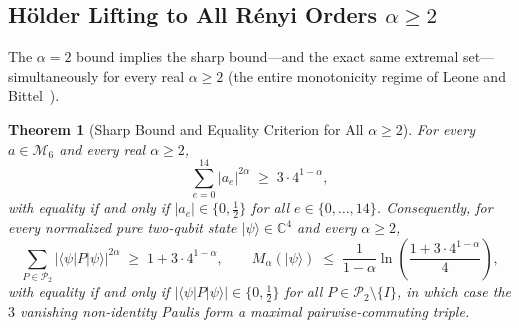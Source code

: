 \documentclass[11pt,a4paper]{article}
\theoremstyle{plain}
\newtheorem{theorem}{Theorem}[section]
\theoremstyle{definition}
\theoremstyle{remark}
\newcommand{\C}{\mathbb{C}}
\newcommand{\ket}[1]{\lvert #1 \rangle}
\newcommand{\expval}[2]{\langle #1 \vert #2 \vert #1 \rangle}
\newcommand{\Pauli}{\mathcal{P}}
\newcommand{\Mman}{\mathcal{M}_6}
\begin{document}
\subsection{H\"older Lifting to All R\'enyi Orders \texorpdfstring{$\alpha \ge 2$}{alpha >= 2}}

The $\alpha = 2$ bound implies the sharp bound---and the exact same extremal set---simultaneously for every real $\alpha \ge 2$ (the entire monotonicity regime of Leone and Bittel~\cite{LeoneBittel2024}).

\begin{theorem}[Sharp Bound and Equality Criterion for All $\alpha \ge 2$]
\label{thm:all-alpha}
For every $a \in \Mman$ and every real $\alpha \ge 2$,
\begin{equation}
  \label{eq:so6-all-alpha}
  \sum_{e=0}^{14} \lvert a_e\rvert^{2\alpha} \;\ge\; 3 \cdot 4^{1-\alpha},
\end{equation}
with equality if and only if $\lvert a_e\rvert \in \{0, \frac{1}{2}\}$ for all $e \in \{0,\dots,14\}$. Consequently, for every normalized pure two-qubit state $\ket{\psi} \in \C^4$ and every $\alpha \ge 2$,
\begin{equation}
  \sum_{P \in \Pauli_2} \lvert\expval{\psi}{P}\rvert^{2\alpha} \;\ge\; 1 + 3 \cdot 4^{1-\alpha},
  \qquad
  M_\alpha(\ket{\psi}) \;\le\; \frac{1}{1-\alpha}\ln\!\left(\frac{1 + 3 \cdot 4^{1-\alpha}}{4}\right),
\end{equation}
with equality if and only if $\lvert\expval{\psi}{P}\rvert \in \{0, \frac{1}{2}\}$ for all $P \in \Pauli_2 \setminus \{I\}$, in which case the $3$ vanishing non-identity Paulis form a maximal pairwise-commuting triple.
\end{theorem}
\end{document}
